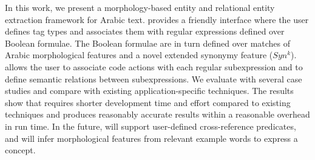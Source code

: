 In this work, we present a morphology-based entity and relational entity extraction framework for Arabic text.
\framework provides a friendly interface where the user defines tag types 
and associates them with regular expressions defined over Boolean formulae.
The Boolean formulae are in turn defined over matches of Arabic morphological features and
a novel extended synonymy feature ($Syn^k$).
\framework allows the user to associate code actions with each regular subexpression and to define semantic relations between subexpressions. 
We evaluate \framework with several case studies and compare with existing application-specific 
techniques.
The results show that \framework requires shorter development time and effort compared 
to existing techniques and produces reasonably accurate results within a reasonable 
overhead in run time. 
In the future, \framework will support user-defined cross-reference predicates, 
and will infer morphological features from relevant example words to express a concept.


